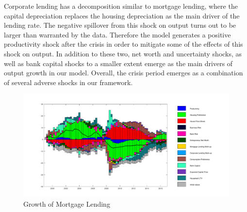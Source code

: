 \documentclass[12pt]{article}
\numberwithin{equation}{section}
\begin{document}
Corporate lending has a decomposition similar to mortgage lending, where the capital depreciation replaces the housing depreciation as the main driver of the lending rate. The negative spillover from this shock on output turns out to be larger than warranted by the data. Therefore the model generates a positive productivity shock after the crisis in order to mitigate some of the effects of this shock on output. In addition to these two, net worth and uncertainty shocks, as well as bank capital shocks to a smaller extent emerge as the main drivers of output growth in our model. Overall, the crisis period emerges as a combination of several adverse shocks in our framework. 













\begin{figure}[H]
\centering
\caption{Growth of Mortgage Lending}
\label{decomp_dbm}
\includegraphics[scale=0.45]{decomp_dbm.pdf}
\end{figure}
\end{document}
